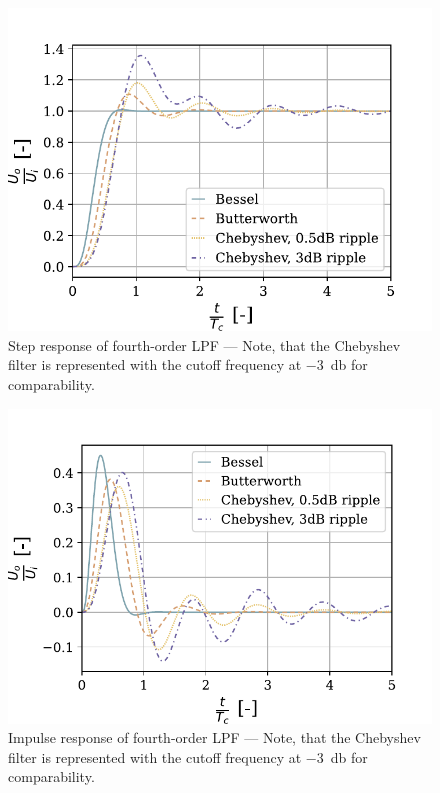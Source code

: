 \begin{figure}[!htb]
  \centering
  \includegraphics[scale=0.72]{figures/electronics/lowpass/lp_filter_4ord_step}
  \caption[Step response of fourth-order \ac{LPF}]{Step response of fourth-order \ac{LPF} --- Note, that the Chebyshev filter is represented with the cutoff frequency at \SI{-3}{\decibel} for comparability.%
    \label{fig:lp_filter_4ord_step}}
\end{figure}

\begin{figure}[!htb]
  \centering
  \includegraphics[scale=0.72]{figures/electronics/lowpass/lp_filter_4ord_imp}
  \caption[Impulse response of fourth-order \ac{LPF}]{Impulse response of fourth-order \ac{LPF} --- Note, that the Chebyshev filter is represented with the cutoff frequency at \SI{-3}{\decibel} for comparability.%
    \label{fig:lp_filter_4ord_imp}}
\end{figure}

